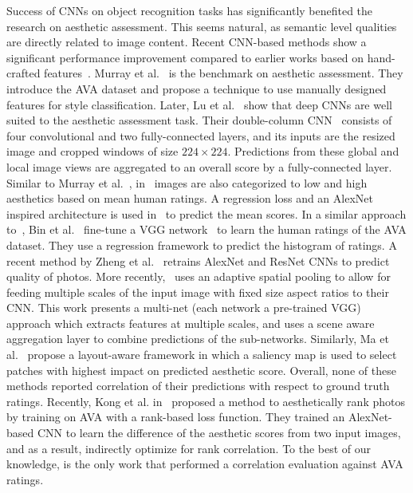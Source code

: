 \documentclass[10pt,twocolumn,twoside]{IEEEtran}
\begin{document}
Success of CNNs on object recognition tasks has significantly benefited the research on aesthetic assessment. This seems natural, as semantic level qualities are directly related to image content. Recent CNN-based methods \cite{lu2015deep, kao2015visual, jin2016image, mai2016composition, kim2017deep} show a significant performance improvement compared to earlier works based on hand-crafted features~\cite{murray2012ava}. Murray et al.~\cite{murray2012ava} is the benchmark on aesthetic assessment. They introduce the AVA dataset and propose a technique to use manually designed features for style classification. Later, Lu et al.~\cite{lu2015deep, lu2015rating} show that deep CNNs are well suited to the aesthetic assessment task. Their double-column CNN~\cite{lu2015rating} consists of four convolutional and two fully-connected layers, and its inputs are the resized image and cropped windows of size $224\times224$. Predictions from these global and local image views are aggregated to an overall score by a fully-connected layer. Similar to Murray et al.~\cite{murray2012ava}, in~\cite{lu2015rating} images are also categorized to low and high aesthetics based on mean human ratings. A regression loss and an AlexNet inspired  architecture is used in~\cite{kao2015visual} to predict the mean scores. In a similar approach to~\cite{kao2015visual}, Bin et al.~\cite{jin2016image} fine-tune a VGG network~\cite{simonyan2014very} to learn the human ratings of the AVA dataset. They use a regression framework to predict the histogram of ratings. A recent method by Zheng et al.~\cite{zeng2017probabilistic} retrains AlexNet and ResNet CNNs to predict quality of photos. More recently,~\cite{mai2016composition} uses an adaptive spatial pooling to allow for feeding multiple scales of the input image with fixed size aspect ratios to their CNN. This work presents a multi-net (each network a pre-trained VGG) approach which extracts features at multiple scales, and uses a scene aware aggregation layer to combine predictions of the sub-networks. Similarly, Ma et al.~\cite{ma2017lamp} propose a layout-aware framework in which a saliency map is used to select patches with highest impact on predicted aesthetic score. Overall, none of these methods reported correlation of their predictions with respect to ground truth ratings. Recently, Kong et al. in~\cite{kong2016photo} proposed a method to aesthetically rank photos by training on AVA with a rank-based loss function. They trained an AlexNet-based CNN to learn the difference of the aesthetic scores from two input images, and as a result, indirectly optimize for rank correlation. To the best of our knowledge, \cite{kong2016photo} is the only work that performed a correlation evaluation against AVA ratings.
\end{document}
